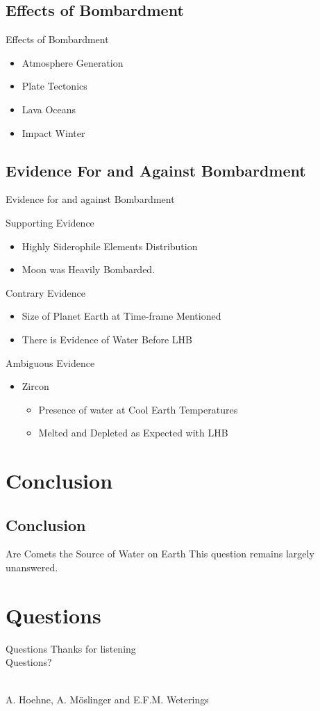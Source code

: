 \documentclass[11pt, aspectratio=169]{beamer}
\begin{document}
\subsection{Effects of Bombardment}
\begin{frame}[t]{Effects of Bombardment}
\begin{itemize}
\item Atmosphere Generation
\item Plate Tectonics
\item Lava Oceans
\item Impact Winter
\end{itemize}
\end{frame}

\subsection{Evidence For and Against Bombardment}
\begin{frame}[t]{Evidence for and against Bombardment}

Supporting Evidence
\begin{itemize}
    \item Highly Siderophile Elements Distribution
    \item Moon was Heavily Bombarded.
\end{itemize}
\medskip
Contrary Evidence
\begin{itemize}
    \item Size of Planet Earth at Time-frame Mentioned
    \item There is Evidence of Water Before LHB
\end{itemize}
\medskip
Ambiguous Evidence
\begin{itemize}
    \item Zircon
        \begin{itemize}
            \item Presence of water at Cool Earth Temperatures
            \item Melted and Depleted as Expected with LHB
        \end{itemize}
\end{itemize}
\end{frame}


\section{Conclusion}
\subsection*{Conclusion}
\begin{frame}[t]{Are Comets the Source of Water on Earth}
\centering
\huge This question remains largely unanswered.
\end{frame}

\section{Questions}
\begin{frame}{Questions}
\centering
\Huge Thanks for listening\\

\huge Questions?\\\

\large A. Hoehne, A. M\"{o}slinger and E.F.M. Weterings\\

\end{frame}
\end{document}

